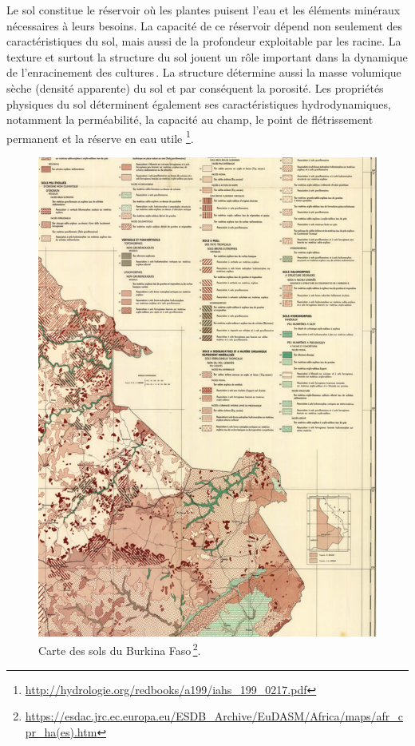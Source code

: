 \documentclass[a4paper,11pt]{article}
\begin{document}
Le sol constitue le réservoir où les plantes puisent l'eau et les
éléments minéraux nécessaires à leurs besoins. La capacité de ce
réservoir dépend non seulement des caractéristiques du sol, mais aussi
de la profondeur exploitable par les racine. La texture et surtout la
structure du sol jouent un rôle important dans la dynamique de
l'enracinement des cultures\,\cite{Chopart_1980}. La structure détermine
aussi la masse volumique sèche (densité apparente) du sol et par
conséquent la porosité. Les propriétés physiques du sol déterminent
également ses caractéristiques hydrodynamiques, notamment la
perméabilité, la capacité au champ, le point de flétrissement
permanent et la réserve en eau utile
\footnote{\url{http://hydrologie.org/redbooks/a199/iahs_199_0217.pdf}}.


\begin{figure}%
 \begin{center}
   \includegraphics[width=12cm]{images/cartepedobf}
  \end{center}
  \caption{Carte des sols du Burkina Faso\,\protect\footnote{\protect\url{https://esdac.jrc.ec.europa.eu/ESDB_Archive/EuDASM/Africa/maps/afr_cpr_ha(es).htm}}.}
\end{figure}
\end{document}
